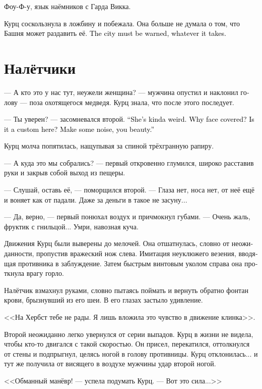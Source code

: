 \documentclass[a4paper,12pt,fleqn]{book}\usepackage{cooltooltips}\usepackage{polyglossia}\setdefaultlanguage[babelshorthands=true]{russian}\setotherlanguage{english}\defaultfontfeatures{Ligatures=TeX,Mapping=tex-text} \usepackage{xcolor}\definecolor{lightgray}{HTML}{bbbbbb}\color{lightgray}\newcommand{\ml}[3]{\textenglish{\textcolor{black}{#3}}}
\begin{document}
Фоу-Ф-у, язык наёмников с Гарда Викка.

Курц соскользнула в ложбину и побежала.
Она больше не думала о том, что Башня может раздавить её.
\ml{$0$}
{Надо предупредить город любой ценой.}
{The city must be warned, whatever it takes.}

\section{Налётчики}

--- А кто это у нас тут, неужели женщина? --- мужчина опустил и наклонил голову --- поза охотящегося медведя.
Курц знала, что после этого последует.

--- Ты уверен? --- засомневался второй.
\ml{$0$}
{--- Какая-то она странная.}
{``She's kinda weird.}
\ml{$0$}
{Почему лицо закрыто?}
{Why face covered?}
\ml{$0$}
{Это у них обычай такой?}
{Is it a custom here?}
\ml{$0$}
{Подай-ка голос, красавица.}
{Make some noise, you beauty.''}

Курц молча попятилась, нащупывая за спиной трёхгранную рапиру.

--- А куда это мы собрались? --- первый откровенно глумился, широко расставив руки и закрыв собой выход из пещеры.

--- Слушай, оставь её, --- поморщился второй.
--- Глаза нет, носа нет, от неё ещё и воняет как от падали.
Даже за деньги в такое не засуну...

--- Да, верно, --- первый понюхал воздух и причмокнул губами.
--- Очень жаль, фруктик с гнильцой...
Умри, навозная куча.

Движения Курц были выверены до мелочей.
Она отшатнулась, словно от неожиданности, пропустив вражеский нож слева.
Имитация неуклюжего везения, вводящая противника в заблуждение.
Затем быстрым винтовым уколом справа она проткнула врагу горло.

Налётчик взмахнул руками, словно пытаясь поймать и вернуть обратно фонтан крови, брызнувший из его шеи.
В его глазах застыло удивление.

<<На Хербст тебе не рады.
Я лишь вложила это чувство в движение клинка>>.

Второй неожиданно легко увернулся от серии выпадов.
Курц в жизни не видела, чтобы кто-то двигался с такой скоростью.
Он присел, перекатился, оттолкнулся от стены и подпрыгнул, целясь ногой в голову противницы.
Курц отклонилась... и тут же получила от висящего в воздухе мужчины удар второй ногой.

<<Обманный манёвр! --- успела подумать Курц.
--- Вот это сила...>>
\end{document}

